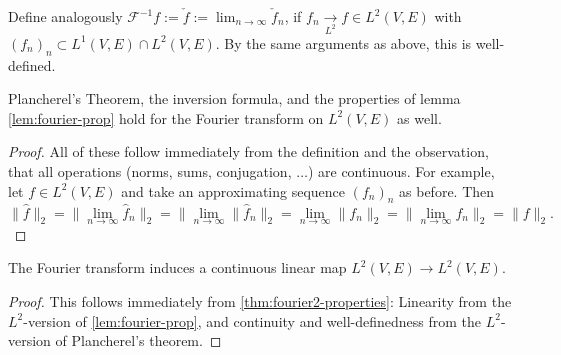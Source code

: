 \begin{definition}
  \label{def:invFourier-L2}
  \lean{}
  Define analogously $\mathcal F^{-1}f:=\check f:=\lim_{n\to\infty}\check f_n$, if $f_n\xrightarrow[L^2]{}f\in L^2(V,E)$
  with $(f_n)_n\subset L^1(V,E)\cap L^2(V,E)$. By the same arguments as above, this is well-defined.
\end{definition}

\begin{corollary}
  \label{thm:fourier2-properties}
  \lean{}
  Plancherel's Theorem, the inversion formula, and the properties of lemma \ref{lem:fourier-prop} hold
  for the Fourier transform on $L^2(V,E)$ as well.
\end{corollary}
\begin{proof}
  All of these follow immediately from the definition and the observation, that all operations (norms, sums, conjugation, $\ldots$) are continuous.
  For example, let $f\in L^2(V,E)$ and take an approximating sequence $(f_n)_n$ as before. Then
  $$\|\widehat f\|_2=\|\lim_{n\to\infty}\widehat f_n\|_2=\|\lim_{n\to\infty}\|\widehat f_n\|_2=\lim_{n\to\infty}\|f_n\|_2
  =\|\lim_{n\to\infty}f_n\|_2=\|f\|_2.$$
\end{proof}

\begin{corollary}
  \label{thm:fourier-is-l2-linear}
  \leanok %
  The Fourier transform induces a continuous linear map $L^2(V,E) \to L^2(V,E)$.
  \end{corollary}
  \begin{proof}
    This follows immediately from \ref{thm:fourier2-properties}: Linearity from the $L^2$-version of
    \ref{lem:fourier-prop}, and continuity and well-definedness from the $L^2$-version of Plancherel's theorem.
\end{proof}